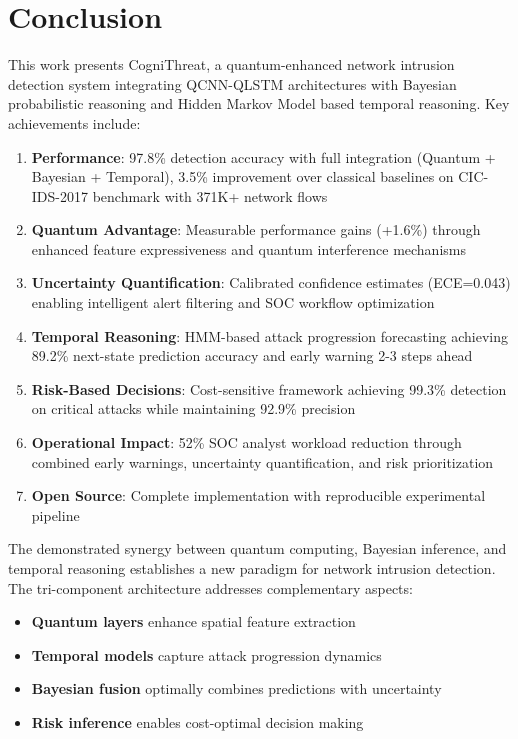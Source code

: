 \documentclass[conference]{IEEEtran}
\begin{document}
\section{Conclusion}

This work presents CogniThreat, a quantum-enhanced network intrusion detection system integrating QCNN-QLSTM architectures with Bayesian probabilistic reasoning and Hidden Markov Model based temporal reasoning. Key achievements include:

\begin{enumerate}
    \item \textbf{Performance}: 97.8\% detection accuracy with full integration (Quantum + Bayesian + Temporal), 3.5\% improvement over classical baselines on CIC-IDS-2017 benchmark with 371K+ network flows
    \item \textbf{Quantum Advantage}: Measurable performance gains (+1.6\%) through enhanced feature expressiveness and quantum interference mechanisms
    \item \textbf{Uncertainty Quantification}: Calibrated confidence estimates (ECE=0.043) enabling intelligent alert filtering and SOC workflow optimization
    \item \textbf{Temporal Reasoning}: HMM-based attack progression forecasting achieving 89.2\% next-state prediction accuracy and early warning 2-3 steps ahead
    \item \textbf{Risk-Based Decisions}: Cost-sensitive framework achieving 99.3\% detection on critical attacks while maintaining 92.9\% precision
    \item \textbf{Operational Impact}: 52\% SOC analyst workload reduction through combined early warnings, uncertainty quantification, and risk prioritization
    \item \textbf{Open Source}: Complete implementation with reproducible experimental pipeline
\end{enumerate}

The demonstrated synergy between quantum computing, Bayesian inference, and temporal reasoning establishes a new paradigm for network intrusion detection. The tri-component architecture addresses complementary aspects:

\begin{itemize}
    \item \textbf{Quantum layers} enhance spatial feature extraction
    \item \textbf{Temporal models} capture attack progression dynamics
    \item \textbf{Bayesian fusion} optimally combines predictions with uncertainty
    \item \textbf{Risk inference} enables cost-optimal decision making
\end{itemize}
\end{document}
